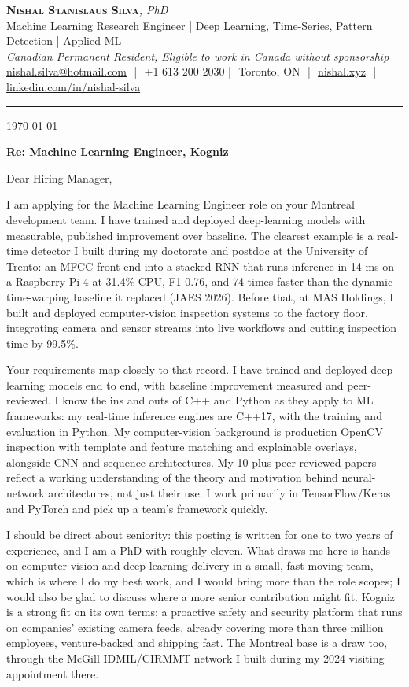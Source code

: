\documentclass[11pt]{article}
\makeatletter
\newcommand{\clName}{Nishal Stanislaus Silva}
\newcommand{\clEmail}{nishal.silva@hotmail.com}
\newcommand{\clPhone}{+1 613 200 2030}
\newcommand{\clCity}{Toronto, ON}
\newcommand{\clSite}{https://nishal.xyz}
\newcommand{\clLinkedIn}{https://www.linkedin.com/in/nishal-silva}
\newcommand{\clStatus}{Canadian Permanent Resident, Eligible to work in Canada without sponsorship}
\newcommand{\clTagline}{Machine Learning Research Engineer | Deep Learning, Time-Series, Pattern Detection | Applied ML}
\newcommand{\clRole}{Machine Learning Engineer}
\newcommand{\clCompany}{Kogniz}
\newcommand{\clAddressee}{Dear Hiring Manager,}
\makeatother
\begin{document}
\pagestyle{empty}
\begin{center}
    {\LARGE \scshape \textbf{\clName}}{\large \textit{, PhD}}\\[1pt]
    {\small \clTagline}\\[1pt]
    {\footnotesize\textit{\clStatus}}\\[1pt]
    {\small
    \href{mailto:\clEmail}{\clEmail} \,\,|\,\, \clPhone \,\,|\,\, \clCity
    \,\,|\,\, \href{\clSite}{nishal.xyz} \,\,|\,\, \href{\clLinkedIn}{linkedin.com/in/nishal-silva}}
\end{center}

\rule{\linewidth}{0.4pt}\vspace{0.6em}

\today

\textbf{Re: \clRole{}, \clCompany{}}

\clAddressee

I am applying for the Machine Learning Engineer role on your Montreal development team. I have trained and deployed deep-learning models with measurable, published improvement over baseline. The clearest example is a real-time detector I built during my doctorate and postdoc at the University of Trento: an MFCC front-end into a stacked RNN that runs inference in 14 ms on a Raspberry Pi 4 at 31.4\% CPU, F1 0.76, and 74 times faster than the dynamic-time-warping baseline it replaced (JAES 2026). Before that, at MAS Holdings, I built and deployed computer-vision inspection systems to the factory floor, integrating camera and sensor streams into live workflows and cutting inspection time by 99.5\%.

Your requirements map closely to that record. I have trained and deployed deep-learning models end to end, with baseline improvement measured and peer-reviewed. I know the ins and outs of C++ and Python as they apply to ML frameworks: my real-time inference engines are C++17, with the training and evaluation in Python. My computer-vision background is production OpenCV inspection with template and feature matching and explainable overlays, alongside CNN and sequence architectures. My 10-plus peer-reviewed papers reflect a working understanding of the theory and motivation behind neural-network architectures, not just their use. I work primarily in TensorFlow/Keras and PyTorch and pick up a team's framework quickly.

I should be direct about seniority: this posting is written for one to two years of experience, and I am a PhD with roughly eleven. What draws me here is hands-on computer-vision and deep-learning delivery in a small, fast-moving team, which is where I do my best work, and I would bring more than the role scopes; I would also be glad to discuss where a more senior contribution might fit. Kogniz is a strong fit on its own terms: a proactive safety and security platform that runs on companies' existing camera feeds, already covering more than three million employees, venture-backed and shipping fast. The Montreal base is a draw too, through the McGill IDMIL/CIRMMT network I built during my 2024 visiting appointment there.
\end{document}
